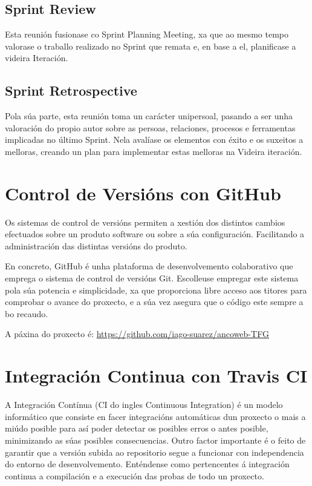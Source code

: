     \subsection{Sprint Review}
        Esta reunión fusionase co Sprint Planning Meeting, xa que ao mesmo tempo valorase o traballo
        realizado no Sprint que remata e, en base a el, planificase a videira Iteración. 
    
    \subsection{Sprint Retrospective}
        Pola súa parte, esta reunión toma un carácter unipersoal, pasando a ser unha valoración do
        propio autor sobre as persoas, relaciones, procesos e ferramentas implicadas no último Sprint.
        Nela avalíase os elementos con éxito e os suxeitos a melloras, creando un plan para implementar
        estas melloras na Videira iteración.

\section{Control de Versións con GitHub}
    Os sistemas de control de versións permiten a xestión dos distintos cambios efectuados sobre
    un produto software ou sobre a súa configuración. Facilitando a administración das distintas
    versións do produto. 
    
    En concreto, GitHub é unha plataforma de desenvolvemento colaborativo que emprega o sistema de
    control de versións Git. Escolleuse empregar este sistema pola súa potencia e simplicidade, xa
    que proporciona libre acceso aos titores para comprobar o avance do proxecto, e a súa vez asegura
    que o código este sempre a bo recaudo.
    
    A páxina do proxecto é: \url{https://github.com/iago-suarez/ancoweb-TFG} 
    
\section{Integración Continua con Travis CI}

    A Integración Contínua (CI do ingles Continuous Integration) é un modelo informático que 
    consiste en facer integracións automáticas dun proxecto o mais a miúdo posible para así 
    poder detectar os posibles erros o antes posible, minimizando as súas posibles consecuencias.
    Outro factor importante é o feito de garantir que a versión subida ao repositorio segue a
    funcionar con independencia do entorno de desenvolvemento. Enténdense como pertencentes á 
    integración continua a compilación e a execución das probas de todo un proxecto.
    
